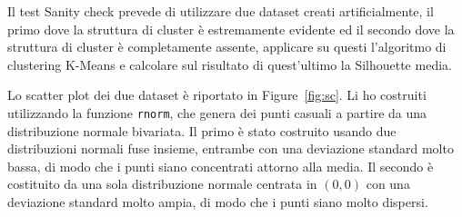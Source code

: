 \documentclass[12pt]{report}
\begin{document}
			Il test Sanity check prevede di utilizzare due dataset creati
			artificialmente, il primo dove la struttura di cluster è
			estremamente evidente ed il secondo dove la struttura di
			cluster è completamente assente, applicare su questi l'algoritmo
			di clustering K-Means e calcolare sul risultato di quest'ultimo
			la Silhouette media.

			Lo scatter plot dei due dataset è riportato in Figure~\ref{fig:sc}.
			Li ho costruiti utilizzando la funzione \texttt{rnorm}, che genera
			dei punti casuali a partire da una distribuzione normale bivariata.	
			Il primo è stato costruito usando due distribuzioni normali fuse
			insieme, entrambe con una deviazione standard molto bassa, di modo
			che i punti siano concentrati attorno alla media. Il secondo è
			costituito da una sola distribuzione normale centrata in $(0, 0)$
			con una deviazione standard molto ampia, di modo che i punti siano
			molto dispersi.
\end{document}
